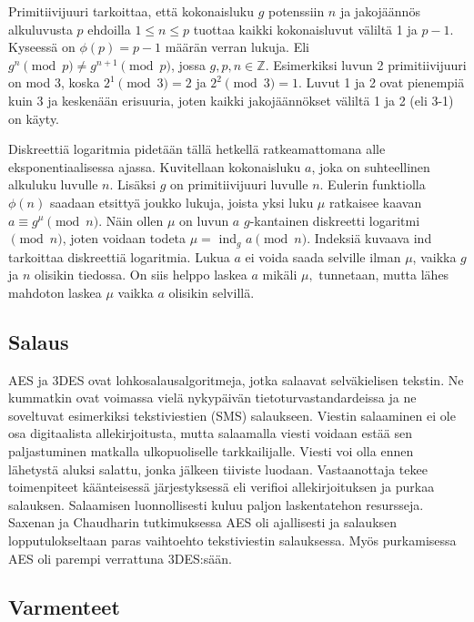 \documentclass[finnish]{tktltiki2}
\theoremstyle{definition}
\theoremstyle{remark}
\begin{document}
Primitiivijuuri tarkoittaa, että kokonaisluku $g$ potenssiin $n$ ja jakojäännös alkuluvusta $p$ ehdoilla $1 \leq n \leq p$ tuottaa kaikki kokonaisluvut väliltä 1 ja $p-1$. Kyseessä on $\phi(p) = p - 1$ määrän verran lukuja. Eli $g^n \pmod{p} \neq g^{n+1} \pmod{p}$, jossa $g, p, n \in \mathbb{Z}$. Esimerkiksi luvun 2 primitiivijuuri on mod 3, koska $2^1 \pmod{3} = 2$ ja $2^2 \pmod{3} = 1$. Luvut 1 ja 2 ovat pienempiä kuin 3 ja keskenään erisuuria, joten kaikki jakojäännökset väliltä 1 ja 2 (eli 3-1) on käyty. \cite{prim}

Diskreettiä logaritmia pidetään tällä hetkellä ratkeamattomana alle eksponentiaalisessa ajassa. Kuvitellaan kokonaisluku $a$, joka on suhteellinen alkuluku luvulle $n$. Lisäksi $g$ on primitiivijuuri luvulle $n$. Eulerin funktiolla $\phi(n)$ saadaan etsittyä joukko lukuja, joista yksi luku $\mu$ ratkaisee kaavan  $a \equiv g^{\mu} \pmod{n}$. Näin ollen $\mu$ on luvun $a$ $g$-kantainen diskreetti logaritmi $\pmod{n}$, joten voidaan todeta $\mu = $ ind$_g$ $a\pmod{n}$. Indeksiä kuvaava ind tarkoittaa diskreettiä logaritmia. Lukua $a$ ei voida saada selville ilman $\mu$, vaikka $g$ ja $n$ olisikin tiedossa. On siis helppo laskea $a$ mikäli $\mu, $ tunnetaan, mutta lähes mahdoton laskea $\mu$ vaikka $a$ olisikin selvillä. \cite{disc}

\subsection{Salaus} 

AES ja 3DES ovat lohkosalausalgoritmeja, jotka salaavat selväkielisen tekstin. Ne kummatkin ovat voimassa vielä nykypäivän tietoturvastandardeissa ja ne soveltuvat esimerkiksi tekstiviestien (SMS) salaukseen. Viestin salaaminen ei ole osa digitaalista allekirjoitusta, mutta salaamalla viesti voidaan estää sen paljastuminen matkalla ulkopuoliselle tarkkailijalle. Viesti voi olla ennen lähetystä aluksi salattu, jonka jälkeen tiiviste luodaan. Vastaanottaja tekee toimenpiteet käänteisessä järjestyksessä eli verifioi allekirjoituksen ja purkaa salauksen. Salaamisen luonnollisesti kuluu paljon laskentatehon resursseja. Saxenan ja Chaudharin tutkimuksessa AES oli ajallisesti ja salauksen lopputulokseltaan paras vaihtoehto tekstiviestin salauksessa. Myös purkamisessa AES oli parempi verrattuna 3DES:sään. \cite{gsm}

\subsection{Varmenteet}
\end{document}
